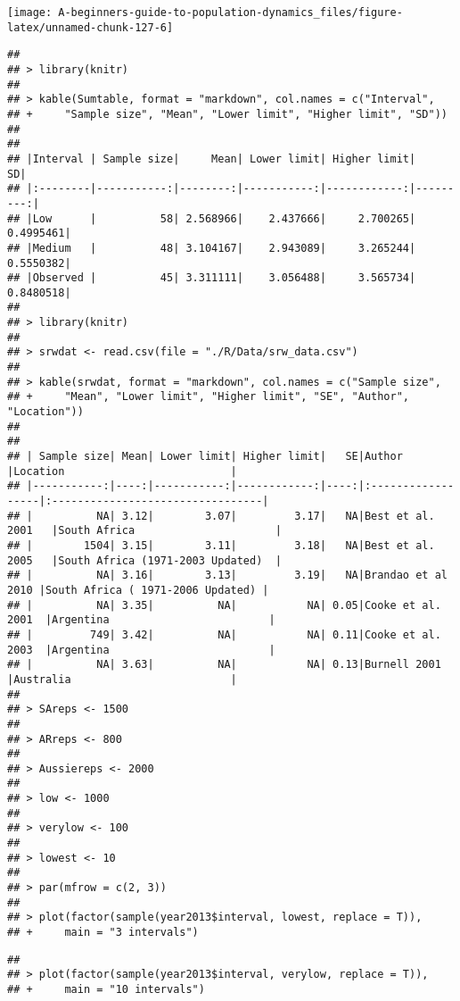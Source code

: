 \documentclass[]{book}
\begin{document}
\begin{center}\texttt{[image: A-beginners-guide-to-population-dynamics\_files/figure-latex/unnamed-chunk-127-6]} \end{center}

\begin{verbatim}
## 
## > library(knitr)
## 
## > kable(Sumtable, format = "markdown", col.names = c("Interval", 
## +     "Sample size", "Mean", "Lower limit", "Higher limit", "SD"))
## 
## 
## |Interval | Sample size|     Mean| Lower limit| Higher limit|        SD|
## |:--------|-----------:|--------:|-----------:|------------:|---------:|
## |Low      |          58| 2.568966|    2.437666|     2.700265| 0.4995461|
## |Medium   |          48| 3.104167|    2.943089|     3.265244| 0.5550382|
## |Observed |          45| 3.311111|    3.056488|     3.565734| 0.8480518|
## 
## > library(knitr)
## 
## > srwdat <- read.csv(file = "./R/Data/srw_data.csv")
## 
## > kable(srwdat, format = "markdown", col.names = c("Sample size", 
## +     "Mean", "Lower limit", "Higher limit", "SE", "Author", "Location"))
## 
## 
## | Sample size| Mean| Lower limit| Higher limit|   SE|Author             |Location                          |
## |-----------:|----:|-----------:|------------:|----:|:------------------|:---------------------------------|
## |          NA| 3.12|        3.07|         3.17|   NA|Best et al. 2001   |South Africa                      |
## |        1504| 3.15|        3.11|         3.18|   NA|Best et al. 2005   |South Africa (1971-2003 Updated)  |
## |          NA| 3.16|        3.13|         3.19|   NA|Brandao et al 2010 |South Africa ( 1971-2006 Updated) |
## |          NA| 3.35|          NA|           NA| 0.05|Cooke et al. 2001  |Argentina                         |
## |         749| 3.42|          NA|           NA| 0.11|Cooke et al. 2003  |Argentina                         |
## |          NA| 3.63|          NA|           NA| 0.13|Burnell 2001       |Australia                         |
## 
## > SAreps <- 1500
## 
## > ARreps <- 800
## 
## > Aussiereps <- 2000
## 
## > low <- 1000
## 
## > verylow <- 100
## 
## > lowest <- 10
## 
## > par(mfrow = c(2, 3))
## 
## > plot(factor(sample(year2013$interval, lowest, replace = T)), 
## +     main = "3 intervals")
\end{verbatim}

\begin{verbatim}
## 
## > plot(factor(sample(year2013$interval, verylow, replace = T)), 
## +     main = "10 intervals")
\end{verbatim}
\end{document}
